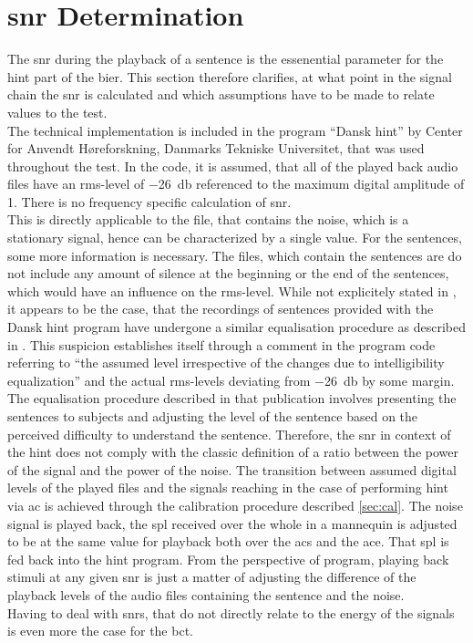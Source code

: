 \section{\gls{snr} Determination}
The \gls{snr} during the playback of a sentence is the essenential parameter for the \gls{hint} part of the \gls{bier}.
This section therefore clarifies, at what point in the signal chain the \gls{snr} is calculated and which assumptions have to be made to relate values to the test.\\
The technical implementation is included in the \matlab program \enquote{Dansk \gls{hint}} by Center for Anvendt Høreforskning, Danmarks Tekniske Universitet, that was used throughout the test.
In the code, it is assumed, that all of the played back audio files have an \gls{rms}-level of \SI{-26}{\decibel} referenced to the maximum digital amplitude of 1. There is no frequency specific calculation of \gls{snr}.\\
This is directly applicable to the file, that contains the noise, which is a stationary signal, hence can be characterized by a single value.
For the sentences, some more information is necessary. The files, which contain the sentences are do not include any amount of silence at the beginning or the end of the sentences, which would have an influence on the \gls{rms}-level.
While not explicitely stated in \citep{hint_2011}, it appears to be the case, that the recordings of sentences provided with the Dansk \gls{hint} program have undergone a similar equalisation procedure as described in \citep{nielsen_dau_09}. 
This suspicion establishes itself through a comment in the program code referring to \enquote{the assumed level irrespective of the changes due to intelligibility equalization} and the actual \gls{rms}-levels deviating from \SI{-26}{\decibel} by some margin.
The equalisation procedure described in that publication involves presenting the sentences to subjects and adjusting the level of the sentence based on the perceived difficulty to understand the sentence.
Therefore, the \gls{snr} in context of the \gls{hint} does not comply with the classic definition of a ratio between the power of the signal and the power of the noise.
The transition between assumed digital levels of the played files and the signals reaching in the case of performing \gls{hint} via \gls{ac} is achieved through the calibration procedure described \autoref{sec:cal}. The noise signal is played back, the \gls{spl} received over the whole in a mannequin is adjusted  to be at the same value for playback both over the \gls{acs} and the \gls{ace}. That \gls{spl} is fed back into the \gls{hint} \matlab program.
From the perspective of program, playing back stimuli at any given \gls{snr} is just a matter of adjusting the difference of the playback levels of the audio files containing the sentence and the noise.\\
Having to deal with \gls{snr}s, that do not directly relate to the energy of the signals is even more the case for the \gls{bct}. 